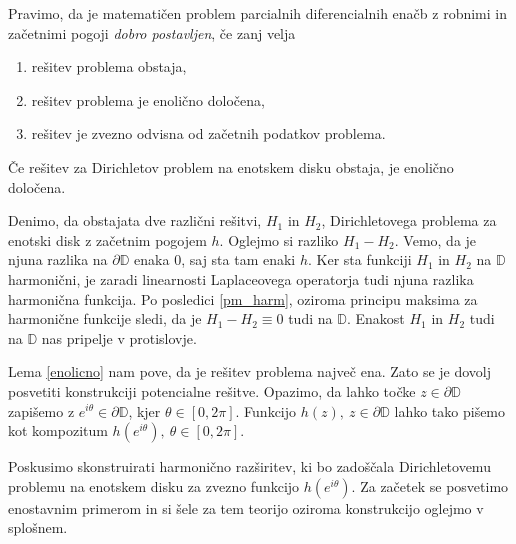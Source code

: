 \documentclass[mat1, tisk]{fmfdelo}
\begin{document}
    \begin{definicija}[J. Hadamard]
        \label{def_dp}
        Pravimo, da je matematičen problem parcialnih diferencialnih enačb z robnimi in začetnimi pogoji \emph{dobro postavljen}, če zanj velja
        \begin{enumerate}[label={\Alph*)}]
            \item rešitev problema obstaja,
            \item rešitev problema je enolično določena,
            \item rešitev je zvezno odvisna od začetnih podatkov problema.
        \end{enumerate}
    \end{definicija}

    \begin{lema}
        \label{enolicno}
        Če rešitev za Dirichletov problem na enotskem disku obstaja, je enolično določena.
    \end{lema}
    \begin{dokaz}
        Denimo, da obstajata dve različni rešitvi, $H_1$ in $H_2$, Dirichletovega problema za enotski disk z začetnim pogojem $h$.
        Oglejmo si razliko $H_1 - H_2$. Vemo, da je njuna razlika na $\partial \mathbb{D}$ enaka $0$, saj sta tam enaki $h$. 
        Ker sta funkciji $H_1$ in $H_2$ na $\mathbb{D}$ harmonični, je zaradi linearnosti Laplaceovega operatorja tudi njuna razlika harmonična funkcija. 
        Po posledici \ref{pm_harm}, oziroma principu maksima za harmonične funkcije sledi, da je $H_1 - H_2 \equiv 0$ tudi na $\mathbb{D}$. Enakost $H_1$ in $H_2$ tudi na $\mathbb{D}$ nas pripelje v protislovje. 
    \end{dokaz}
    
    Lema \ref{enolicno} nam pove, da je rešitev problema največ ena. Zato se je dovolj posvetiti konstrukciji potencialne rešitve. 
    Opazimo, da lahko točke $z \in \partial \mathbb{D}$ zapišemo z \mbox{$e^{i \theta} \in \partial \mathbb{D}$}, kjer $\theta \in [0,2\pi]$. Funkcijo $h(z),~z \in \partial \mathbb{D}$ lahko tako pišemo kot kompozitum $h(e^{i \theta}),~\theta \in [0,2\pi]$.

    Poskusimo skonstruirati harmonično razširitev, ki bo zadoščala Dirichletovemu problemu na enotskem disku za zvezno funkcijo $h(e^{i \theta})$.
    Za začetek se posvetimo enostavnim primerom in si šele za tem teorijo oziroma konstrukcijo oglejmo v splošnem. 
    
\end{document}
